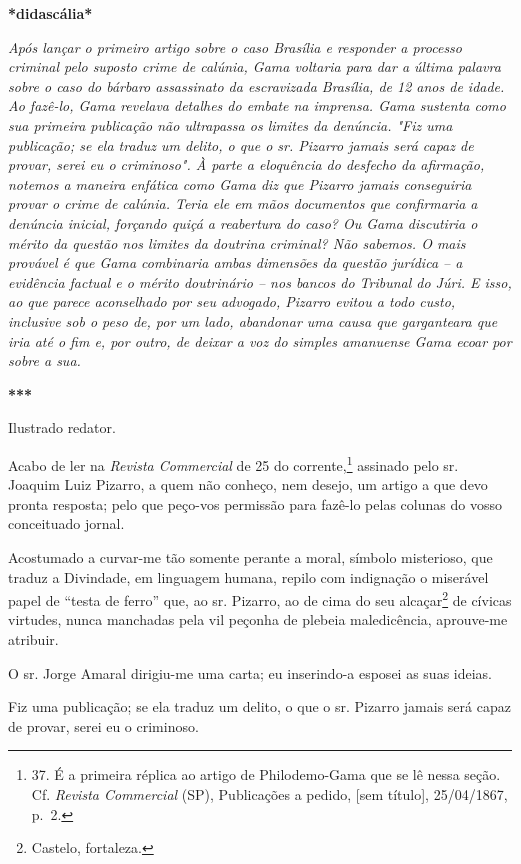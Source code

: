 \textbf{*didascália*}

\emph{Após lançar o primeiro artigo sobre o caso Brasília e responder a
processo criminal pelo suposto crime de calúnia, Gama voltaria para dar
a última palavra sobre o caso do bárbaro assassinato da escravizada
Brasília, de 12 anos de idade. Ao fazê-lo, Gama revelava detalhes do
embate na imprensa. Gama sustenta como sua primeira publicação não
ultrapassa os limites da denúncia. "Fiz uma publicação; se ela traduz um
delito, o que o sr. Pizarro jamais será capaz de provar, serei eu o
criminoso". À parte a eloquência do desfecho da afirmação, notemos a
maneira enfática como Gama diz que Pizarro jamais conseguiria provar o
crime de calúnia. Teria ele em mãos documentos que confirmaria a
denúncia inicial, forçando quiçá a reabertura do caso? Ou Gama
discutiria o mérito da questão nos limites da doutrina criminal? Não
sabemos. O mais provável é que Gama combinaria ambas dimensões da
questão jurídica -- a evidência factual e o mérito doutrinário -- nos
bancos do Tribunal do Júri. E isso, ao que parece aconselhado por seu
advogado, Pizarro evitou a todo custo, inclusive sob o peso de, por um
lado, abandonar uma causa que garganteara que iria até o fim e, por
outro, de deixar a voz do simples amanuense Gama ecoar por sobre a sua.}

\textbf{***}

Ilustrado redator.

Acabo de ler na \emph{Revista Commercial} de 25 do
corrente,\textsuperscript{⁠}\footnote{37. É a primeira réplica ao artigo
  de Philodemo-Gama que se lê nessa seção. Cf. \emph{Revista Commercial}
  (SP), Publicações a pedido, {[}sem título{]}, 25/04/1867, p.~2.}
assinado pelo sr. Joaquim Luiz Pizarro, a quem não conheço, nem desejo,
um artigo a que devo pronta resposta; pelo que peço-vos permissão para
fazê-lo pelas colunas do vosso conceituado jornal.

Acostumado a curvar-me tão somente perante a moral, símbolo misterioso,
que traduz a Divindade, em linguagem humana, repilo com indignação o
miserável papel de ``testa de ferro'' que, ao sr. Pizarro, ao de cima do
seu alcaçar\textsuperscript{⁠}\footnote{Castelo, fortaleza.} de cívicas
virtudes, nunca manchadas pela vil peçonha de plebeia maledicência,
aprouve-me atribuir.

O sr. Jorge Amaral dirigiu-me uma carta; eu inserindo-a esposei as suas
ideias.

Fiz uma publicação; se ela traduz um delito, o que o sr. Pizarro jamais
será capaz de provar, serei eu o criminoso.


